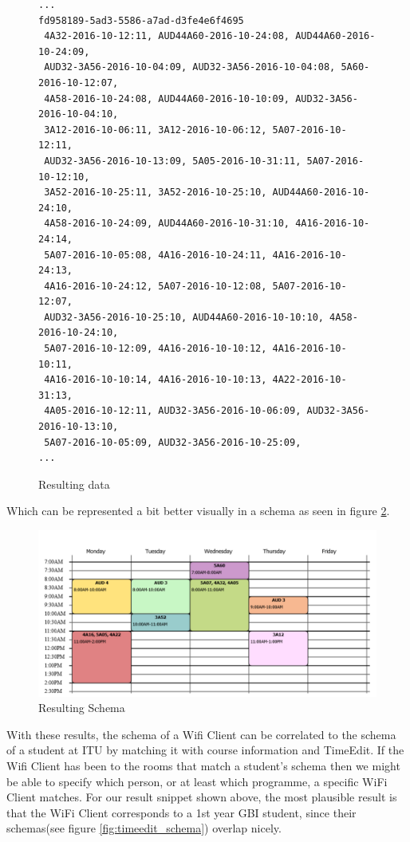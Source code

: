 \begin{figure}[H]
	\begin{lstlisting}[frame=single, backgroundcolor=\color{light-gray}, basicstyle=\footnotesize\ttfamily]
...
fd958189-5ad3-5586-a7ad-d3fe4e6f4695	
 4A32-2016-10-12:11, AUD44A60-2016-10-24:08, AUD44A60-2016-10-24:09, 
 AUD32-3A56-2016-10-04:09, AUD32-3A56-2016-10-04:08, 5A60-2016-10-12:07, 
 4A58-2016-10-24:08, AUD44A60-2016-10-10:09, AUD32-3A56-2016-10-04:10, 
 3A12-2016-10-06:11, 3A12-2016-10-06:12, 5A07-2016-10-12:11, 
 AUD32-3A56-2016-10-13:09, 5A05-2016-10-31:11, 5A07-2016-10-12:10,
 3A52-2016-10-25:11, 3A52-2016-10-25:10, AUD44A60-2016-10-24:10,
 4A58-2016-10-24:09, AUD44A60-2016-10-31:10, 4A16-2016-10-24:14,
 5A07-2016-10-05:08, 4A16-2016-10-24:11, 4A16-2016-10-24:13,
 4A16-2016-10-24:12, 5A07-2016-10-12:08, 5A07-2016-10-12:07,
 AUD32-3A56-2016-10-25:10, AUD44A60-2016-10-10:10, 4A58-2016-10-24:10,
 5A07-2016-10-12:09, 4A16-2016-10-10:12, 4A16-2016-10-10:11,
 4A16-2016-10-10:14, 4A16-2016-10-10:13, 4A22-2016-10-31:13,
 4A05-2016-10-12:11, AUD32-3A56-2016-10-06:09, AUD32-3A56-2016-10-13:10,
 5A07-2016-10-05:09, AUD32-3A56-2016-10-25:09,
...
	\end{lstlisting}
	\caption{Resulting data}
	\label{fig:result_data}
\end{figure}

\newpar Which can be represented a bit better visually in a schema as seen in figure \ref{fig:result_schema}.

\begin{figure}[H]
	\centering
	\includegraphics[width=\linewidth]{figures/schema-from-data.png}
	\caption{Resulting Schema}
	\label{fig:result_schema}
\end{figure}

\newpar With these results, the schema of a Wifi Client can be correlated to the schema of a student at ITU by matching it with course information and TimeEdit. If the Wifi Client has been to the rooms that match a student's schema then we might be able to specify which person, or at least which programme, a specific WiFi Client matches. For our result snippet shown above, the most plausible result is that the WiFi Client corresponds to a 1st year GBI student, since their schemas(see figure \ref{fig:timeedit_schema}) overlap nicely.


